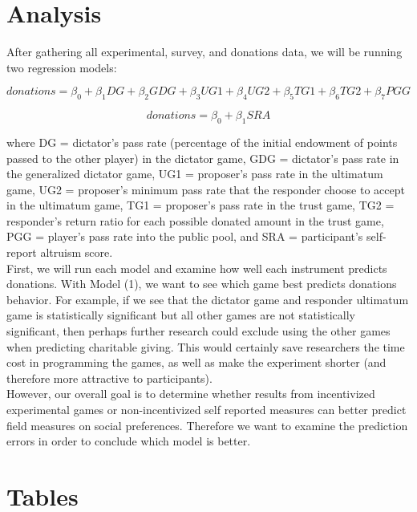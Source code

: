 \documentclass{article}
\begin{document}
\section{Analysis}

After gathering all experimental, survey, and donations data, we will be running two regression models:

\begin{equation}
donations= \beta_{0} + \beta_{1} DG + \beta_{2} GDG + \beta_{3} UG1 + \beta_{4} UG2 + \beta_{5} TG1 + \beta_{6} TG2 + \beta_{7} PGG
\end{equation}

\begin{equation}
donations = \beta_{0} + \beta_{1} SRA
\end{equation}

where DG = dictator\rq s pass rate (percentage of the initial endowment of points passed to the other player) in the dictator game, GDG = dictator\rq s pass rate in the generalized dictator game, UG1 = proposer\rq s pass rate in the ultimatum game, UG2 = proposer\rq s minimum pass rate that the responder choose to accept in the ultimatum game, TG1 = proposer\rq s pass rate in the trust game, TG2 = responder\rq s return ratio for each possible donated amount in the trust game, PGG = player\rq s pass rate into the public pool, and SRA = participant\rq s self-report altruism score. \\

First, we will run each model and examine how well each instrument predicts donations. With Model (1), we want to see which game best predicts donations behavior. For example, if we see that the dictator game and responder ultimatum game is statistically significant but all other games are not statistically significant, then perhaps further research could exclude using the other games when predicting charitable giving. This would certainly save researchers the time cost in programming the games, as well as make the experiment shorter (and therefore more attractive to participants). \\

However, our overall goal is to determine whether results from incentivized experimental games or non-incentivized self reported measures can better predict field measures on social preferences. Therefore we want to examine the prediction errors in order to conclude which model is better. 


\appendix
\section{Tables}
\end{document}
